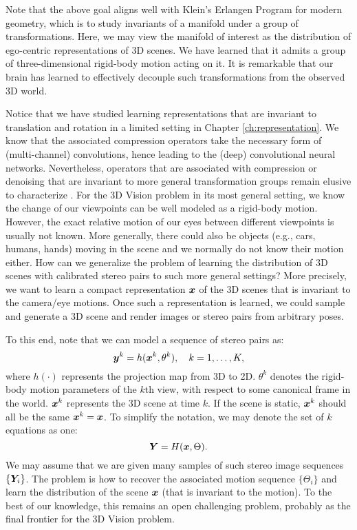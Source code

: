 \documentclass[../../book-main.tex]{subfiles}
\begin{document}
\begin{remark}Note that the above goal aligns well with Klein's Erlangen Program for modern geometry, which is to study invariants of a manifold under a group of transformations. Here, we may view the manifold of interest as the distribution of ego-centric representations of 3D scenes. We have learned that it admits a group of three-dimensional rigid-body motion acting on it. It is remarkable that our brain has learned to effectively decouple such transformations from the observed 3D world.
\end{remark}


Notice that we have studied learning representations that are invariant to translation and rotation in a limited setting in Chapter \ref{ch:representation}. We know that the associated compression operators take the necessary form of (multi-channel) convolutions, hence leading to the (deep) convolutional neural networks. Nevertheless, operators that are associated with compression or denoising that are invariant to more general transformation groups remain elusive to characterize \cite{cohen2016group}.  
For the 3D Vision problem in its most general setting, we know the change of our viewpoints can be well modeled as a rigid-body motion. However, the exact relative motion of our eyes between different viewpoints is usually not known. More generally, there could also be objects (e.g., cars, humans, hands) moving in the scene and we normally do not know their motion either. How can we generalize the problem of learning the distribution of 3D scenes with calibrated stereo pairs to such more general settings? More precisely, we want to learn a compact representation $\bm{x}$ of the 3D scenes that is invariant to the camera/eye motions. Once such a representation is learned, we could sample and generate a 3D scene and render images or stereo pairs from arbitrary poses. 


To this end, note that we can model a sequence of stereo pairs as:
\begin{equation}
    \bm{y}^k = h(\bm{x}^k, \theta^k), \quad k=1, \ldots, K,
\end{equation}
where $h(\cdot)$ represents the projection map from 3D to 2D. $\theta^k$ denotes the rigid-body motion parameters of the $k$th view, with respect to some canonical frame in the world. $\bm{x}^k$ represents the 3D scene at time $k$. If the scene is static, $\bm{x}^k$ should all be the same $\bm{x}^k = \bm{x}$. To simplify the notation, we may denote the set of $k$ equations as one:
\begin{equation}
    \bm{Y} = H(\bm{x},\Theta). 
\end{equation}
We may assume that we are given many samples of such stereo image sequences $\{\bm{Y}_i\}$. The problem is how to recover the associated motion sequence $\{\Theta_i\}$ and learn the distribution of the scene $\bm{x}$ (that is invariant to the motion). To the best of our knowledge, this remains an open challenging problem, probably as the final frontier for the 3D Vision problem. 
\end{document}
